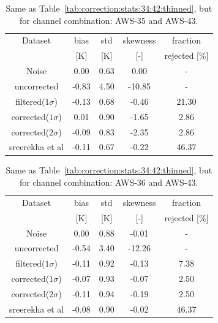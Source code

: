 \documentclass[12pt]{article}
\begin{document}
\begin{table}[!p]
	\centering
	\begin{tabular}[b]{c|c|c|c|c}
		Dataset  		  &   bias &   std &   skewness & fraction \\
		&   [K]  &   [K] & [-] & rejected [\%]\\
		\hline
		Noise           	  &  0.00  &  0.63 &               0.00 &                -\\
		uncorrected     	  &  -0.83 &  4.50 &             -10.85 &                - \\
		filtered($1\sigma$)	  &  -0.13 &  0.68 &              -0.46 &               21.30 \\
		corrected($1\sigma$)  &   0.01 &  0.90 &              -1.65 &                2.86 \\
		corrected($2\sigma$)  &  -0.09 &  0.83 &              -2.35 &                2.86 \\
		sreerekha et al       &  -0.11 &  0.67 &              -0.22 &               46.37 \\
		\hline
	\end{tabular}
	\caption{Same as Table~\ref{tab:correction:stats:34:42:thinned}, but for channel combination: AWS-35 and AWS-43.}
	\label{tab:correction:stats:35:43}
\end{table}

\begin{table}[!p]
	\centering
	\begin{tabular}[b]{c|c|c|c|c}
		Dataset  		  &   bias &   std &   skewness & fraction  \\
		&   [K]  &   [K] & [-] & rejected [\%]\\
		\hline
		Noise            	 &  0.00 &  0.88 &              -0.01 &               - \\
		uncorrected      	 &  -0.54 &  3.40 &             -12.26 &                - \\
		filtered($1\sigma$)  &  -0.11 &  0.92 &              -0.13 &                7.38 \\
		corrected($1\sigma$) &  -0.07 &  0.93 &              -0.07 &                2.50 \\
		corrected($2\sigma$) &  -0.11 &  0.94 &              -0.19 &                2.50 \\
		sreerekha et al      &  -0.08 &  0.90 &              -0.02 &               46.37 \\
		\hline
	\end{tabular}
	\caption{Same as Table~\ref{tab:correction:stats:34:42:thinned}, but for channel combination: AWS-36 and AWS-43.   }
	\label{tab:correction:stats:36:43}
\end{table}
\end{document}
